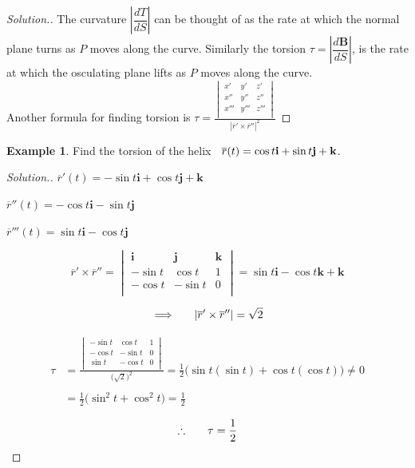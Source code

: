 \documentclass[11pt,a4paper]{article}
\theoremstyle{definition}
\newtheorem{exa}[thm]{Example}
\newenvironment{solution}
  {\renewcommand{\qedsymbol}{}\begin{proof}[\textit{Solution}.]}
  {\end{proof}}
\begin{document}
\begin{solution}
The curvature $\left|\dfrac{d T}{dS}\right|$ can be thought of as the rate at which the normal plane turns as $P$ moves along the curve. Similarly the torsion $\tau = \left|\dfrac{d\textbf{B}}{dS}\right|$, is the rate at which the osculating plane lifts as $P$ moves along the curve.\\

Another formula for finding torsion is \hspace{0.3cm}$\displaystyle{\tau = \frac{\begin{vmatrix}
x' & y' & z'\\
x'' & y'' & z''\\
x''' & y''' & z'''\\
\end{vmatrix}
}{\left|\overline{r}' \times \overline{r}''\right|^2
}}$
\end{solution}


\begin{exa}


Find the torsion of the helix $\hspace{0.2cm} \overline{r}(t) = \cos t \textbf{i} + \sin t \textbf{j} + \textbf{k}$.
\end{exa}


\begin{solution}


$\overline{r}'(t) = -\sin t \textbf{i} + \cos t \textbf{j} + \textbf{k}$


$\overline{r}''(t) = -\cos t \textbf{i} - \sin t \textbf{j}$


$\overline{r}'''(t) = \sin t \textbf{i} - \cos t \textbf{j}$

$$\overline{r}' \times \overline{r}'' = \begin{vmatrix}
\textbf{i} & \textbf{j} & \textbf{k}\\
-\sin t & \cos t & 1 \\
-\cos t & -\sin t & 0\\
\end{vmatrix} = \sin t\textbf{i} -\cos t\textbf{k} + \textbf{k}$$

$$\implies \hspace{0.5cm} \left|\overline{r}' \times \overline{r}''\right| = \sqrt{2}$$

\begin{align*}
\tau & = \frac{\begin{vmatrix}
-\sin t & \cos t & 1\\
-\cos t & -\sin t & 0\\
\sin t & -\cos t & 0 \\
\end{vmatrix}
}{\big(\sqrt{2}\big)^2}
 =\frac{1}{2}\big( \sin t (\sin t) + \cos t (\cos t)\big) \neq 0\\\\
& = \frac{1}{2}\big(\sin^2t + \cos^2t\big) = \frac{1}{2}
\end{align*}

$$\therefore\hspace{0.6cm} \tau = \frac{1}{2}$$
\end{solution}
\end{document}
